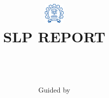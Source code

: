 \documentclass[12pt]{beamer}
\title[\textbf{\uppercase{\projectTitle}}]{ 
  \includegraphics[height=1cm]{images/IITB_logo.png} \\
  \large {SLP REPORT}
  \\ [0.5cm]
  \HRule{0.5pt} \\
  \LARGE \textbf{\uppercase{\projectTitle}}
  \HRule{1pt}
}
\author[\studentName]{
  \studentName \\
  Guided by \guideName
}
\institute[IITB] {
  \department \\
  \instituteName \\
}
\date{}
\begin{document}
\frame{\titlepage}




% 




\end{document}
